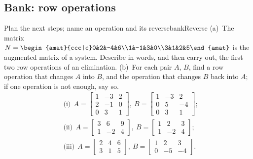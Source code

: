 \documentclass[11pt]{article}
\begin{document}
\subsection*{Bank: row operations}

\begin{exmp}{Plan the next steps; name an operation and its reverse}{bankReverse}
(a)~The matrix $N=\begin{amat}{ccc|c}0&2&-4&6\\1&-1&3&0\\3&1&2&5\end{amat}$ is the augmented matrix of a system. Describe in words, and then carry out, the first two row operations of an elimination. (b)~For each pair $A$, $B$, find a row operation that changes $A$ into $B$, and the operation that changes $B$ back into $A$; if one operation is not enough, say so.
\begin{align*}
&\text{(i)}\ \ A=\begin{bmatrix}1&-3&2\\2&-1&0\\0&3&1\end{bmatrix},\ B=\begin{bmatrix}1&-3&2\\0&5&-4\\0&3&1\end{bmatrix};\\[4pt]
&\text{(ii)}\ \ A=\begin{bmatrix}3&6&9\\1&-2&4\end{bmatrix},\ B=\begin{bmatrix}1&2&3\\1&-2&4\end{bmatrix};\\[4pt]
&\text{(iii)}\ \ A=\begin{bmatrix}2&4&6\\3&1&5\end{bmatrix},\ B=\begin{bmatrix}1&2&3\\0&-5&-4\end{bmatrix}.
\end{align*}


\end{exmp}
\end{document}
